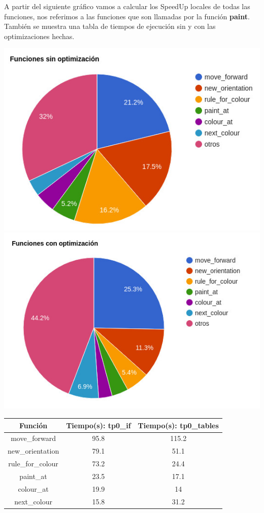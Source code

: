 \documentclass[a4paper, 10pt, twoside, notitlepage]{article}
\begin{document}
\newpage
A partir del siguiente gráfico vamos a calcular los SpeedUp locales de todas las funciones, nos referimos a las funciones que son llamadas por la función \textbf{paint}. También se muestra una tabla de tiempos de ejecución sin y con las optimizaciones hechas.

\includegraphics[scale=3]{chart.jpg} \\

\includegraphics[scale=3]{chart2.jpg} \\

\begin{tabular}{|c|c|c|}
\hline 
Función & Tiempo(s): tp0\_if & Tiempo(s): tp0\_tables \\ 
\hline 
move\_forward & 95.8 & 115.2 \\ 
\hline 
new\_orientation & 79.1 & 51.1 \\ 
\hline 
rule\_for\_colour & 73.2 & 24.4 \\ 
\hline 
paint\_at & 23.5 & 17.1 \\ 
\hline 
colour\_at & 19.9 & 14 \\ 
\hline 
next\_colour & 15.8 & 31.2 \\ 
\hline 
\end{tabular} \\
 
\end{document}
